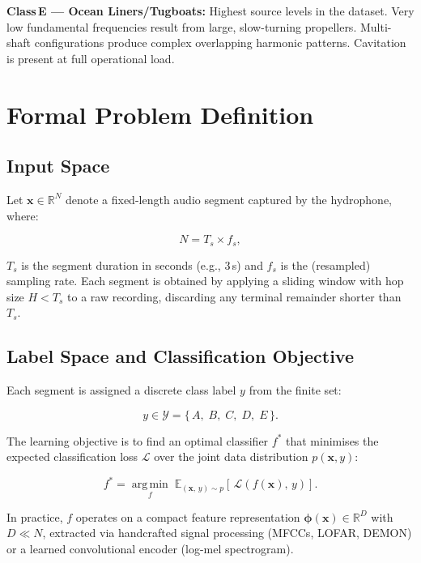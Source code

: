 \documentclass[conference]{IEEEtran}
\begin{document}
\textbf{Class\,E --- Ocean Liners/Tugboats:} Highest source levels in the
dataset. Very low fundamental frequencies result from large, slow-turning
propellers. Multi-shaft configurations produce complex overlapping harmonic
patterns. Cavitation is present at full operational load.

% 
\section{Formal Problem Definition}

\subsection{Input Space}

Let $\mathbf{x} \in \mathbb{R}^{N}$ denote a fixed-length audio segment
captured by the hydrophone, where:

\begin{equation}
  N = T_s \times f_s,
  \label{eq:input_dim}
\end{equation}

$T_s$ is the segment duration in seconds (e.g., 3\,s) and $f_s$ is the
(resampled) sampling rate. Each segment is obtained by applying a sliding
window with hop size $H < T_s$ to a raw recording, discarding any terminal
remainder shorter than $T_s$.

\subsection{Label Space and Classification Objective}

Each segment is assigned a discrete class label $y$ from the finite set:

\begin{equation}
  y \in \mathcal{Y} = \{\,A,\; B,\; C,\; D,\; E\,\}.
  \label{eq:label_set}
\end{equation}

The learning objective is to find an optimal classifier $f^*$ that minimises
the expected classification loss $\mathcal{L}$ over the joint data
distribution $p(\mathbf{x}, y)$:

\begin{equation}
  f^* = \operatorname*{arg\,min}_{f}\;
        \mathbb{E}_{(\mathbf{x},\,y)\sim p}\!\left[\,
        \mathcal{L}\!\left(f(\mathbf{x}),\, y\right)\right].
  \label{eq:objective}
\end{equation}

In practice, $f$ operates on a compact feature representation
$\boldsymbol{\phi}(\mathbf{x}) \in \mathbb{R}^{D}$ with $D \ll N$, extracted
via handcrafted signal processing (MFCCs, LOFAR, DEMON) or a learned
convolutional encoder (log-mel spectrogram).
\end{document}
